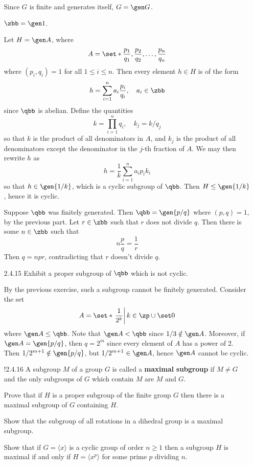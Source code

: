 \begin{solenum}
    \item Since $G$ is finite and generates itself, $G = \gen G$. 
    \item $\zbb = \gen 1$.
    \item Let $H = \gen A$, where
    \[
    	A = \set*{\frac{p_1}{q_1}, \frac{p_2}{q_2}, \ldots, \frac{p_n}{q_n}}
    \]
    where $(p_i, q_i) = 1$ for all $1 \leq i \leq n$.
	Then every element $h \in H$ is of the form
    \[
    	h = \sum_{i = 1}^n a_i\frac{p_i}{q_i}, \quad a_i \in \zbb
    \]
    since $\qbb$ is abelian.
	Define the quantities
    \[
    	k = \prod_{i = 1}^n q_i, \quad k_j = k/q_j
    \]
    so that $k$ is the product of all denominators in $A$, and $k_j$ is the product of all denominators except the denominator in the $j$-th fraction of $A$.
	We may then rewrite $h$ as
    \[
    	h = \frac 1k \sum_{i = 1}^n a_ip_ik_i
    \]
    so that $h \in \gen{1/k}$, which is a cyclic subgroup of $\qbb$.
	Then $H \leq \gen{1/k}$, hence it is cyclic.
    \item Suppose $\qbb$ was finitely generated.
	Then $\qbb = \gen{p/q}$ where $(p, q) = 1$, by the previous part.
	Let $r \in \zbb$ such that $r$ does not divide $q$.
	Then there is some $n \in \zbb$ such that
    \[
    	n \frac pq = \frac 1r
    \]
    Then $q = npr$, contradicting that $r$ doesn't divide $q$.
\end{solenum}

\begin{exercise}{2.4.15}
    Exhibit a proper subgroup of $\qbb$ which is not cyclic.
\end{exercise}

\begin{sol}
    By the previous exercise, such a subgroup cannot be finitely generated.
	Consider the set
    \[
    	A = \set*{\left. \frac 1{2^k} \right| k \in \zp \cup \set 0}
    \]
    where $\gen A \leq \qbb$.
	Note that $\gen A < \qbb$ since $1/3 \notin \gen A$.
	Moreover, if $\gen A = \gen{p/q}$, then $q = 2^m$ since every element of $A$ has a power of 2.
	Then $1/2^{m + 1} \notin \gen{p/q}$, but $1/2^{m + 1} \in \gen A$, hence $\gen A$ cannot be cyclic.
\end{sol}

\begin{exercise}!{2.4.16}
    A subgroup $M$ of a group $G$ is called a \textbf{maximal subgroup} if $M\ne G$ and the only subgroups of $G$ which contain $M$ are $M$ and $G$.
    \begin{subexercises}
        \item Prove that if $H$ is a proper subgroup of the finite group $G$ then there is a maximal subgroup of $G$ containing $H$.
        \item Show that the subgroup of all rotations in a dihedral group is a maximal subgroup.
        \item Show that if $G=\langle x\rangle$ is a cyclic group of order $n\geq 1$ then a subgroup $H$ is maximal if and only if $H=\langle x^p\rangle$ for some prime $p$ dividing $n$.
    \end{subexercises}
\end{exercise}

